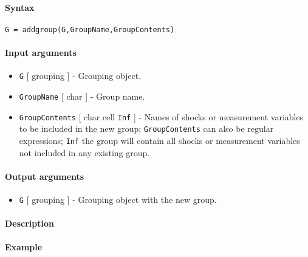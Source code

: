 


	\paragraph{Syntax}\label{syntax}

\begin{verbatim}
G = addgroup(G,GroupName,GroupContents)
\end{verbatim}

\paragraph{Input arguments}\label{input-arguments}

\begin{itemize}
\item
  \texttt{G} {[} grouping {]} - Grouping object.
\item
  \texttt{GroupName} {[} char {]} - Group name.
\item
  \texttt{GroupContents} {[} char \textbar{} cell \textbar{}
  \texttt{Inf} {]} - Names of shocks or measurement variables to be
  included in the new group; \texttt{GroupContents} can also be regular
  expressions; \texttt{Inf} the group will contain all shocks or
  measurement variables not included in any existing group.
\end{itemize}

\paragraph{Output arguments}\label{output-arguments}

\begin{itemize}
\itemsep1pt\parskip0pt
\item
  \texttt{G} {[} grouping {]} - Grouping object with the new group.
\end{itemize}

\paragraph{Description}\label{description}

\paragraph{Example}\label{example}


